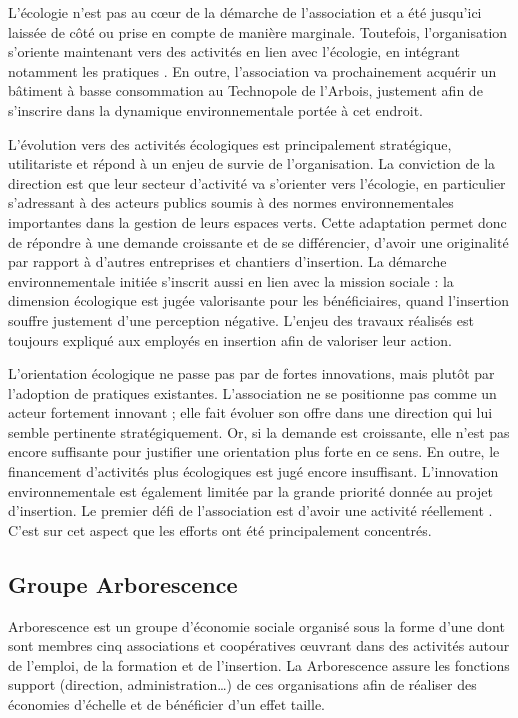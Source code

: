         L’écologie n’est pas au cœur de la démarche de l’association et a été jusqu’ici laissée de côté ou prise en compte de manière marginale. Toutefois, l’organisation s’oriente maintenant vers des activités en lien avec l’écologie, en intégrant notamment les pratiques . En outre, l’association va prochainement acquérir un bâtiment à  basse consommation au Technopole de l’Arbois, justement afin de s’inscrire dans la dynamique environnementale portée à cet endroit.

        L’évolution vers des activités écologiques est principalement stratégique, utilitariste et répond à un enjeu de survie de l’organisation. La conviction de la direction est que leur secteur d’activité va s’orienter vers l’écologie, en particulier s’adressant à des acteurs publics soumis à des normes environnementales importantes dans la gestion de leurs espaces verts. Cette adaptation permet donc de répondre à une demande croissante et de se différencier, d’avoir une originalité par rapport à d’autres entreprises et chantiers d’insertion. La démarche environnementale initiée s’inscrit aussi en lien avec la mission sociale : la dimension écologique est jugée valorisante pour les bénéficiaires, quand l’insertion souffre justement d’une perception négative. L’enjeu des travaux réalisés est toujours expliqué aux employés en insertion afin de valoriser leur action.

        L’orientation écologique ne passe pas par de fortes innovations, mais plutôt par l’adoption de pratiques existantes. L’association ne se positionne pas comme un acteur fortement innovant ; elle fait évoluer son offre dans une direction qui lui semble pertinente stratégiquement. Or, si la demande est croissante, elle n’est pas encore suffisante pour justifier une orientation plus forte en ce sens. En outre, le financement d’activités plus écologiques est jugé encore insuffisant. L’innovation environnementale est également limitée par la grande priorité donnée au projet d’insertion. Le premier défi de l’association est d’avoir une activité réellement . C’est sur cet aspect que les efforts ont été principalement concentrés.


    \subsection{Groupe Arborescence}

        Arborescence est un groupe d’économie sociale organisé sous la forme d’une \scic dont sont membres cinq associations et coopératives œuvrant dans des activités autour de l’emploi, de la formation et de l’insertion. La \scic Arborescence assure les fonctions support (direction, administration…) de ces organisations afin de réaliser des économies d’échelle et de bénéficier d’un effet taille.

